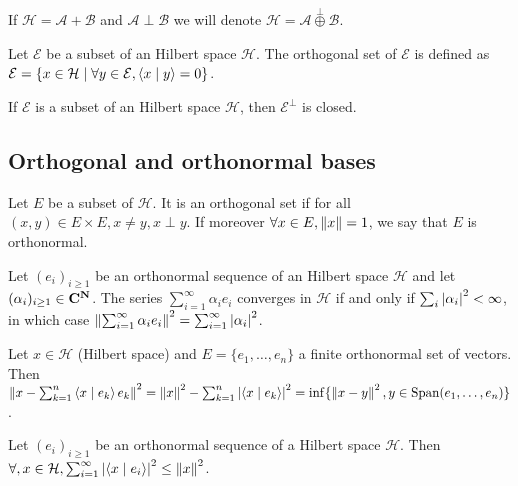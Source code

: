\begin{note}
	If $\mathcal{H} = \mathcal{A} + \mathcal{B}$ and $\mathcal{A} \perp \mathcal{B}$ we will denote $\mathcal{H} = \mathcal{A} \overset{\perp}{\oplus} \mathcal{B}$.
\end{note}

\begin{defn}
	Let $\mathcal{E}$ be a subset of an Hilbert space $\mathcal{H}$.
	The orthogonal set of $\mathcal{E}$ is defined as $\mathcal{E} = \{ x \in \mathcal{H} \mid \forall y \in \mathcal{E}, \left\langle x \mid y \right\rangle = 0 \}$.
\end{defn}

\begin{thm}
	If $\mathcal{E}$ is a subset of an Hilbert space $\mathcal{H}$, then $\mathcal{E}^{\perp}$ is closed.
\end{thm}


\subsection*{Orthogonal and orthonormal bases}

	\begin{defn}
		Let $E$ be a subset of $\mathcal{H}$.
		It is an orthogonal set if for all $(x,y) \in E \times E, x \neq y, x \perp y$.
		If moreover $\forall x \in E, \left\lVert x\right\rVert = 1$, we say that $E$ is orthonormal.
	\end{defn}

	\begin{thm}
		Let $(e_{i})_{i \geq 1}$ be an orthonormal sequence of an Hilbert space $\mathcal{H}$ and let $(\alpha_{i})_{i \geq 1} \in \mathbf{C}^{\mathbf{N}}$.
		The series $\sum_{i = 1}^\infty \alpha_i e_i$ converges in $\mathcal{H}$ if and only if $\sum_i \left\lvert\alpha_i\right\rvert^2 < \infty$, in which case $\left\lVert\sum_{i = 1}^\infty \alpha_i e_i\right\rVert^2 = \sum_{i = 1}^\infty \left\lvert\alpha_i\right\rvert^2$.
	\end{thm}

	\begin{pop}
		Let $x \in \mathcal{H}$ (Hilbert space) and $E = \{ e_1, \ldots, e_n \}$ a finite orthonormal set of vectors.
		Then $\left\lVert x - \sum_{k = 1}^n \left\langle x \mid e_k \right\rangle e_k\right\rVert^2
			= \left\lVert x\right\rVert^2 - \sum_{k = 1}^n \left\lvert\left\langle x \mid e_k \right\rangle\right\rvert^2
			= \inf \{ \left\lVert x - y\right\rVert^2, y \in \operatorname{Span}(e_1, \ldots, e_n) \}$.
	\end{pop}

	\begin{cor}
		Let $(e_i)_{i \geq 1}$ be an orthonormal sequence of a Hilbert space $\mathcal{H}$.
		Then$\forall, x \in \mathcal{H}, \sum_{i = 1}^\infty \left\lvert\left\langle x \mid e_i \right\rangle\right\rvert^2 \leq \left\lVert x\right\rVert^2$.
	\end{cor}

